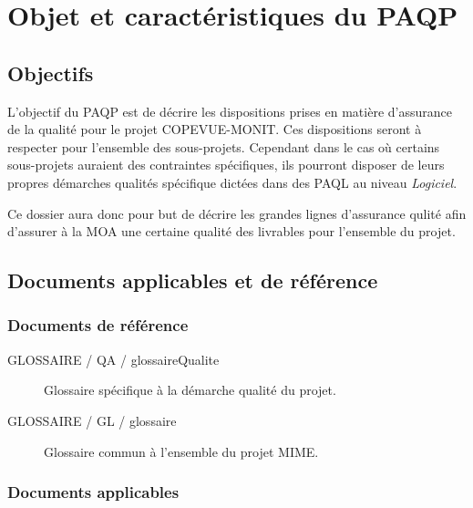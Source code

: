 \documentclass{mise_en_page}
\begin{document}
\maketitle

\begin{historique}
\end{historique}

\newpage

\tableofcontents

\section{Objet et caractéristiques du PAQP}

\subsection{Objectifs}
L’objectif du PAQP est de décrire les dispositions prises en matière d’assurance de la qualité pour le projet COPEVUE-MONIT. Ces dispositions seront à respecter pour l'ensemble des sous-projets. Cependant dans le cas où certains sous-projets auraient des contraintes spécifiques, ils pourront disposer de leurs propres démarches qualités spécifique dictées dans des PAQL au niveau \emph{Logiciel}.

Ce dossier aura donc pour but de décrire les grandes lignes d'assurance qulité afin d'assurer à la MOA une certaine qualité des livrables pour l'ensemble du projet.

\subsection{Documents applicables et de référence}

\subsubsection{Documents de référence}

\begin{description}
	\item[GLOSSAIRE / QA / glossaireQualite ] Glossaire spécifique à la démarche qualité du projet.
	\item[GLOSSAIRE / GL / glossaire ] Glossaire commun à l'ensemble du projet MIME.
\end{description}

\subsubsection{Documents applicables}
\end{document}
